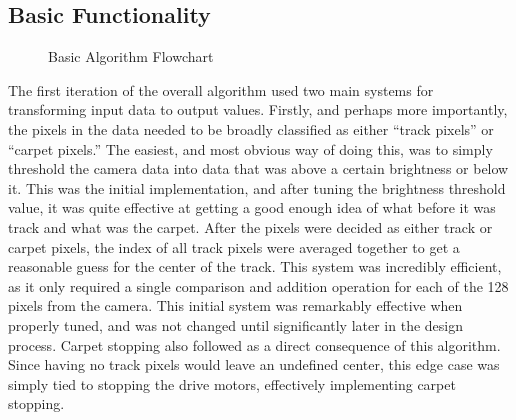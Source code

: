 \documentclass[conference]{IEEEtran}
\begin{document}
\subsection{Basic Functionality}

\begin{figure}
    \centering
    \caption{Basic Algorithm Flowchart}
    \label{firstAlgo}
\end{figure}

    The first iteration of the overall algorithm used two main systems for transforming input data to output values. Firstly,
    and perhaps more importantly, the pixels in the data needed to be broadly classified as either ``track pixels'' or ``carpet pixels.''
    The easiest, and most obvious way of doing this, was to simply threshold the camera data into data that was above a certain brightness or below it.
    This was the initial implementation, and after tuning the brightness threshold value, it was quite effective at getting a good enough idea of
    what before it was track and what was the carpet.
    After the pixels were decided as either track or carpet pixels, the index of all track pixels were averaged together to get a reasonable guess
    for the center of the track.
    This system was incredibly efficient, as it only required a single comparison and addition operation for each of the 128 pixels from the camera.
    This initial system was remarkably effective when properly tuned, and was not changed until significantly later in the design process.
    Carpet stopping also followed as a direct consequence of this algorithm. Since having no track pixels would leave an undefined center, this edge
    case was simply tied to stopping the drive motors, effectively implementing carpet stopping.
\end{document}
